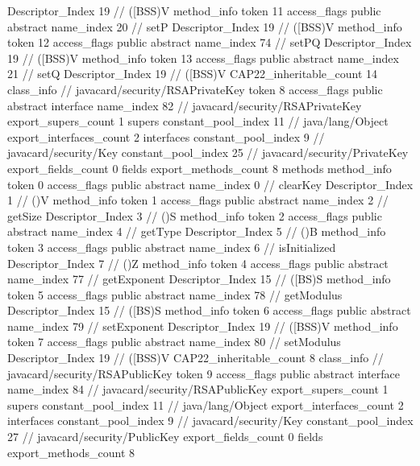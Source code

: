 {{{{{					Descriptor_Index	19		// ([BSS)V
				}
				method_info {
					token	11
					access_flags	public abstract
					name_index	20		// setP
					Descriptor_Index	19		// ([BSS)V
				}
				method_info {
					token	12
					access_flags	public abstract
					name_index	74		// setPQ
					Descriptor_Index	19		// ([BSS)V
				}
				method_info {
					token	13
					access_flags	public abstract
					name_index	21		// setQ
					Descriptor_Index	19		// ([BSS)V
				}
			}
			CAP22_inheritable_count	14
		}
		class_info {		// javacard/security/RSAPrivateKey
			token	8
			access_flags	public abstract interface
			name_index	82		// javacard/security/RSAPrivateKey
			export_supers_count	1
			supers {
				constant_pool_index	11		// java/lang/Object
			}
			export_interfaces_count	2
			interfaces {
				constant_pool_index	9		// javacard/security/Key
				constant_pool_index	25		// javacard/security/PrivateKey
			}
			export_fields_count	0
			fields {
			}
			export_methods_count	8
			methods {
				method_info {
					token	0
					access_flags	public abstract
					name_index	0		// clearKey
					Descriptor_Index	1		// ()V
				}
				method_info {
					token	1
					access_flags	public abstract
					name_index	2		// getSize
					Descriptor_Index	3		// ()S
				}
				method_info {
					token	2
					access_flags	public abstract
					name_index	4		// getType
					Descriptor_Index	5		// ()B
				}
				method_info {
					token	3
					access_flags	public abstract
					name_index	6		// isInitialized
					Descriptor_Index	7		// ()Z
				}
				method_info {
					token	4
					access_flags	public abstract
					name_index	77		// getExponent
					Descriptor_Index	15		// ([BS)S
				}
				method_info {
					token	5
					access_flags	public abstract
					name_index	78		// getModulus
					Descriptor_Index	15		// ([BS)S
				}
				method_info {
					token	6
					access_flags	public abstract
					name_index	79		// setExponent
					Descriptor_Index	19		// ([BSS)V
				}
				method_info {
					token	7
					access_flags	public abstract
					name_index	80		// setModulus
					Descriptor_Index	19		// ([BSS)V
				}
			}
			CAP22_inheritable_count	8
		}
		class_info {		// javacard/security/RSAPublicKey
			token	9
			access_flags	public abstract interface
			name_index	84		// javacard/security/RSAPublicKey
			export_supers_count	1
			supers {
				constant_pool_index	11		// java/lang/Object
			}
			export_interfaces_count	2
			interfaces {
				constant_pool_index	9		// javacard/security/Key
				constant_pool_index	27		// javacard/security/PublicKey
			}
			export_fields_count	0
			fields {
			}
			export_methods_count	8
}}}
